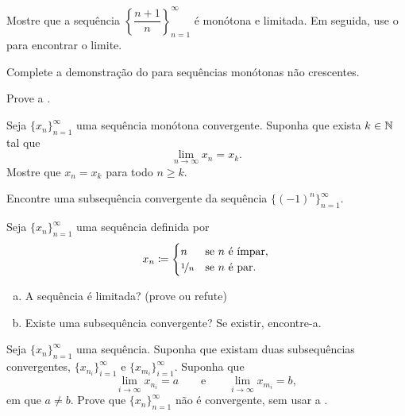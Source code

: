 \begin{exercise}
Mostre que a sequência
$\left\{ \dfrac{n+1}{n} \right\}_{n=1}^\infty$
é monótona e limitada. Em seguida, use o
 para encontrar o limite.
\end{exercise}

\begin{exercise}
Complete a demonstração do  para sequências
monótonas não crescentes.
\end{exercise}

\begin{exercise}
Prove a .
\end{exercise}

\begin{exercise}
Seja $\{ x_n \}_{n=1}^\infty$ uma sequência monótona convergente. Suponha
que exista $k \in {\mathbb{N}}$ tal que
\begin{equation*}
\lim_{n\to \infty} x_n = x_k .
\end{equation*}
Mostre que $x_n = x_k$ para todo $n \geq k$.
\end{exercise}

\begin{exercise}
\pagebreak[2]
Encontre uma subsequência convergente da sequência
$\bigl\{ {(-1)}^n \bigr\}_{n=1}^\infty$.
\end{exercise}

\begin{exercise}
Seja $\{x_n\}_{n=1}^\infty$ uma sequência definida por
\begin{equation*}
x_n \coloneqq 
\begin{cases}
n               & \text{se } n \text{ é ímpar} , \\
\nicefrac{1}{n} & \text{se } n \text{ é par} .
\end{cases}
\avoidbreak
\end{equation*}
\begin{enumerate}[a)]
\item A sequência é limitada? (prove ou refute)
\item Existe uma subsequência convergente? Se existir, encontre-a.
\end{enumerate}
\end{exercise}

\begin{exercise}
\pagebreak[2]
Seja $\{ x_n \}_{n=1}^\infty$ uma sequência.
Suponha que existam duas subsequências convergentes,
$\{ x_{n_i} \}_{i=1}^\infty$ e $\{ x_{m_i} \}_{i=1}^\infty$. Suponha que
\begin{equation*}
\lim_{i\to\infty} x_{n_i} = a
\qquad \text{e} \qquad
\lim_{i\to\infty} x_{m_i} = b,
\end{equation*}
em que $a \neq b$. Prove que $\{ x_n \}_{n=1}^\infty$ não é convergente,
sem usar a .
\end{exercise}

